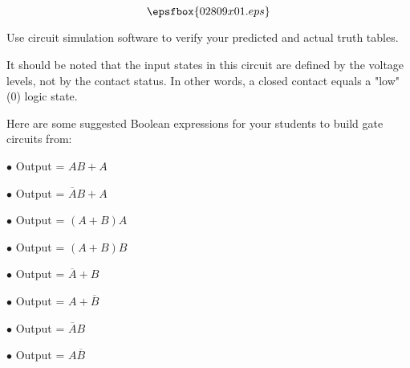 

$$\epsfbox{02809x01.eps}$$

\vfil \eject






Use circuit simulation software to verify your predicted and actual truth tables.







It should be noted that the input states in this circuit are defined by the voltage levels, not by the contact status.  In other words, a closed contact equals a "low" (0) logic state.

Here are some suggested Boolean expressions for your students to build gate circuits from:

\medskip
\goodbreak
\item{$\bullet$} Output = $AB + A$
\item{$\bullet$} Output = $\overline{A}B + A$
\item{$\bullet$} Output = $(A + B)A$
\item{$\bullet$} Output = $(A + B)B$
\item{$\bullet$} Output = $\overline{A} + B$
\item{$\bullet$} Output = $A + \overline{B}$
\item{$\bullet$} Output = $\overline{A}B$
\item{$\bullet$} Output = $A\overline{B}$
\medskip




